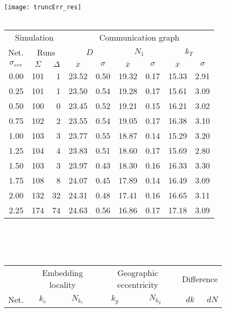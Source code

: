 \documentclass{article}
\begin{document}
\begin{figure}[h]
\begin{center}
\texttt{[image: truncErr\_res]}
~\\~\\
\begin{tabular}{|r|rr|rr|rr|rr|}
\hline
\multicolumn{3}{|c|}{Simulation} & \multicolumn{6}{|c|}{Communication graph}\\
\multicolumn{1}{|c}{Net.} & \multicolumn{2}{c|}{Runs} & \multicolumn{2}{|c}{$D$} & \multicolumn{2}{c}{$N_1$} & \multicolumn{2}{c|}{$k_T$}\\
\hline
\multicolumn{1}{|c|}{$\sigma_{err}$} & \multicolumn{1}{|c}{$\Sigma$} & \multicolumn{1}{c|}{$\Delta$} & \multicolumn{1}{|c}{$\overline{x}$} & \multicolumn{1}{c|}{$\sigma$} & \multicolumn{1}{|c}{$\overline{x}$} & \multicolumn{1}{c|}{$\sigma$} & \multicolumn{1}{|c}{$\overline{x}$} & \multicolumn{1}{c|}{$\sigma$}\\
0.00 & 101 &  1 & 23.52 & 0.50 & 19.32 & 0.17 & 15.33 & 2.91\\
0.25 & 101 &  1 & 23.50 & 0.54 & 19.28 & 0.17 & 15.61 & 3.09\\
0.50 & 100 &  0 & 23.45 & 0.52 & 19.21 & 0.15 & 16.21 & 3.02\\
0.75 & 102 &  2 & 23.55 & 0.54 & 19.05 & 0.17 & 16.38 & 3.10\\
1.00 & 103 &  3 & 23.77 & 0.55 & 18.87 & 0.14 & 15.29 & 3.20\\
1.25 & 104 &  4 & 23.83 & 0.51 & 18.60 & 0.17 & 15.69 & 2.80\\
1.50 & 103 &  3 & 23.97 & 0.43 & 18.30 & 0.16 & 16.33 & 3.30\\
1.75 & 108 &  8 & 24.07 & 0.45 & 17.89 & 0.14 & 16.49 & 3.09\\
2.00 & 132 & 32 & 24.31 & 0.48 & 17.41 & 0.16 & 16.65 & 3.11\\
2.25 & 174 & 74 & 24.63 & 0.56 & 16.86 & 0.17 & 17.18 & 3.09\\
\hline
\end{tabular}\\
~\\~\\
\begin{tabular}{|r|rr|rr|rr|rr|rr|}
\hline
& \multicolumn{4}{|c|}{Embedding locality} & \multicolumn{4}{|c|}{Geographic eccentricity} & \multicolumn{2}{|c|}{Difference}\\
Net. & \multicolumn{2}{c}{$k_e$} & \multicolumn{2}{c|}{$N_{k_e}$} & \multicolumn{2}{c}{$k_g$} & \multicolumn{2}{c|}{$N_{k_g}$}& $dk$ & $dN$\\

\end{tabular}
\end{center}
\end{figure}
\end{document}
